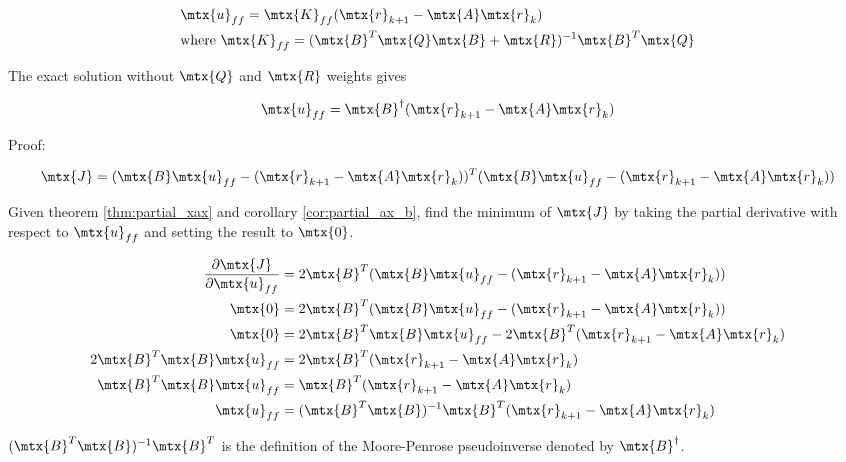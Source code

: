 \begin{theorem}
  \label{thm:linear_plant_inversion}

  \begin{align}
    &\mtx{u}_{ff} = \mtx{K}_{ff} (\mtx{r}_{k+1} - \mtx{A}\mtx{r}_k) \\
    &\text{where } \mtx{K}_{ff} =
      (\mtx{B}^T\mtx{Q}\mtx{B} + \mtx{R})^{-1}\mtx{B}^T\mtx{Q}
  \end{align}

  The exact solution without $\mtx{Q}$ and $\mtx{R}$ weights gives

  \begin{equation}
    \mtx{u}_{ff} = \mtx{B}^\dagger (\mtx{r}_{k+1} - \mtx{A}\mtx{r}_k)
  \end{equation}

  Proof:

  \begin{equation*}
    \mtx{J} = (\mtx{B}\mtx{u}_{ff} - (\mtx{r}_{k+1} - \mtx{A}\mtx{r}_k))^T
      (\mtx{B}\mtx{u}_{ff} - (\mtx{r}_{k+1} - \mtx{A}\mtx{r}_k))
  \end{equation*}

  Given theorem \ref{thm:partial_xax} and corollary \ref{cor:partial_ax_b}, find
  the minimum of $\mtx{J}$ by taking the partial derivative with respect to
  $\mtx{u}_{ff}$ and setting the result to $\mtx{0}$.

  \begin{align*}
    \frac{\partial\mtx{J}}{\partial\mtx{u}_{ff}} &= 2\mtx{B}^T
      (\mtx{B}\mtx{u}_{ff} - (\mtx{r}_{k+1} - \mtx{A}\mtx{r}_k)) \\
    \mtx{0} &= 2\mtx{B}^T
      (\mtx{B}\mtx{u}_{ff} - (\mtx{r}_{k+1} - \mtx{A}\mtx{r}_k)) \\
    \mtx{0} &= 2\mtx{B}^T\mtx{B}\mtx{u}_{ff} -
      2\mtx{B}^T(\mtx{r}_{k+1} - \mtx{A}\mtx{r}_k) \\
    2\mtx{B}^T\mtx{B}\mtx{u}_{ff} &=
      2\mtx{B}^T(\mtx{r}_{k+1} - \mtx{A}\mtx{r}_k) \\
    \mtx{B}^T\mtx{B}\mtx{u}_{ff} &=
      \mtx{B}^T(\mtx{r}_{k+1} - \mtx{A}\mtx{r}_k) \\
    \mtx{u}_{ff} &=
      (\mtx{B}^T\mtx{B})^{-1} \mtx{B}^T(\mtx{r}_{k+1} - \mtx{A}\mtx{r}_k)
  \end{align*}

  $(\mtx{B}^T\mtx{B})^{-1} \mtx{B}^T$ is the definition of the Moore-Penrose
  pseudoinverse denoted by $\mtx{B}^\dagger$.
\end{theorem}

